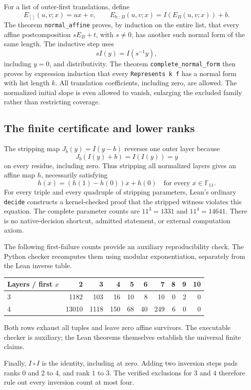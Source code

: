 \documentclass[11pt]{article}
\newcommand{\F}{\mathbb F}
\begin{document}
For a list of outer-first translations, define
\[
 E_{[]}(u,v;x)=ux+v,\qquad
 E_{b::B}(u,v;x)=I(E_B(u,v;x))+b.
\]
The theorem \texttt{normal\_affine} proves, by induction on the entire list, that every affine postcomposition $sE_B+t$, with $s\ne0$, has another such normal form of the same length. The inductive step uses
\[
 sI(y)=I(s^{-1}y),
\]
including $y=0$, and distributivity. The theorem \texttt{complete\_normal\_form} then proves by expression induction that every \texttt{Represents k f} has a normal form with list length $k$. All translation coefficients, including zero, are allowed. The normalized initial slope is even allowed to vanish, enlarging the excluded family rather than restricting coverage.

\subsection{The finite certificate and lower ranks}
The stripping map $J_b(y)=I(y-b)$ reverses one outer layer because
\[
 J_b(I(y)+b)=I(I(y))=y
\]
on every residue, including zero. Thus stripping all normalized layers gives an affine map $h$, necessarily satisfying
\[
 h(x)=(h(1)-h(0))x+h(0)\quad\text{for every }x\in\F_{11}.
\]
For every triple and every quadruple of stripping parameters, Lean's ordinary \texttt{decide} constructs a kernel-checked proof that the stripped witness violates this equation. The complete parameter counts are $11^3=1331$ and $11^4=14641$. There is no native-decision shortcut, admitted statement, or external computation axiom.

The following first-failure counts provide an auxiliary reproducibility check. The Python checker recomputes them using modular exponentiation, separately from the Lean inverse table.
\begin{center}
\begin{tabular}{lrrrrrrrrr}
\toprule
Layers / first $x$ & 2&3&4&5&6&7&8&9&10\\
\midrule
3 &1182&103&16&10&8&10&0&2&0\\
4 &13010&1118&150&68&40&249&6&0&0\\
\bottomrule
\end{tabular}
\end{center}
Both rows exhaust all tuples and leave zero affine survivors. The executable checker is auxiliary; the Lean theorems themselves establish the universal finite claims.

Finally, $I\circ I$ is the identity, including at zero. Adding two inversion steps pads ranks $0$ and $2$ to $4$, and rank $1$ to $3$. The verified exclusions for $3$ and $4$ therefore rule out every inversion count at most four.
\end{document}

